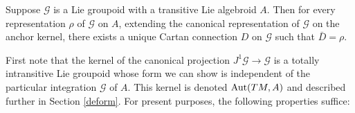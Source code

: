 \documentclass[leqno,12pt]{amsart} %
\begin{document}
\begin{proposition}
  Suppose ${\mathcal G} $ is a Lie groupoid with a transitive Lie algebroid $A$. Then for
  every representation $\rho $ of ${\mathcal G} $ on $A$, extending the canonical
  representation of ${\mathcal G} $ on the anchor kernel, there exists a unique Cartan
  connection $D$ on ${\mathcal G} $ such that $\bar D = \rho $.
\end{proposition}

First note that the kernel of the canonical projection
$J^1 {\mathcal G} \rightarrow {\mathcal G} $ is a totally intransitive Lie groupoid whose
form we can show is independent of the particular integration ${\mathcal G} $ of $A$. This
kernel is denoted $\operatorname{Aut}(TM, A)$ and described further in Section
\ref{deform}. For present purposes, the following properties suffice:
\end{document}
